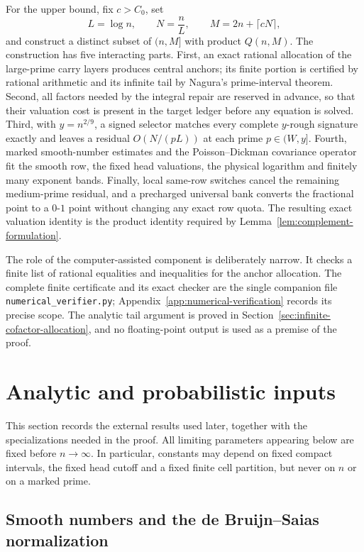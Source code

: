 \documentclass[11pt]{article}
\numberwithin{equation}{section}
\theoremstyle{definition}
\theoremstyle{remark}
\newcommand{\1}{\mathbf 1}
\begin{document}
For the upper bound, fix \(c>C_0\), set
\[
       L=\log n,\qquad N=\frac nL,\qquad
       M=2n+\lceil cN\rceil,
\]
and construct a distinct subset of \((n,M]\) with product \(Q(n,M)\).
The construction has five interacting parts.
First, an exact rational allocation of the large-prime carry layers produces
central anchors; its finite portion is certified by rational arithmetic and
its infinite tail by Nagura's prime-interval theorem.  Second, all factors
needed by the integral repair are reserved in advance, so that their
valuation cost is present in the target ledger before any equation is
solved.  Third, with \(y=n^{2/9}\), a signed selector matches every complete
\(y\)-rough signature exactly and leaves a residual
\(O(N/(pL))\) at each prime \(p\in(W,y]\).  Fourth, marked smooth-number
estimates and the Poisson--Dickman covariance operator fit the smooth row,
the fixed head valuations, the physical logarithm and finitely many exponent
bands.  Finally, local same-row switches cancel the remaining medium-prime
residual, and a precharged universal bank converts the fractional point to a
\(0\)-\(1\) point without changing any exact row quota.  The resulting exact
valuation identity is the product identity required by
Lemma~\ref{lem:complement-formulation}.

The role of the computer-assisted component is deliberately narrow.  It
checks a finite list of rational equalities and inequalities for the anchor
allocation.  The complete finite certificate and its exact checker are the
single companion file \texttt{numerical\_verifier.py};
Appendix~\ref{app:numerical-verification} records its precise scope.  The
analytic tail argument is proved in Section~\ref{sec:infinite-cofactor-allocation},
and no floating-point output is used as a premise of the proof.
 \section{Analytic and probabilistic inputs}
\label{sec:analytic-tools}

This section records the external results used later, together with the
specializations needed in the proof.  All limiting parameters appearing
below are fixed before \(n\to\infty\).  In particular, constants may depend
on fixed compact intervals, the fixed head cutoff and a fixed finite cell
partition, but never on \(n\) or on a marked prime.

\subsection{Smooth numbers and the de Bruijn--Saias normalization}
\label{subsec:smooth-input}
\end{document}

